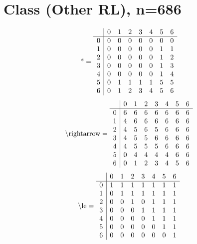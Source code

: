 \documentclass[11pt]{article}
\begin{document}
\section{Class (Other RL), n=686}
\[\text{*} = 
\begin{array}{r | r r r r r r r}
 & 0 & 1 & 2 & 3 & 4 & 5 & 6 \\ \hline
0 & 0 & 0 & 0 & 0 & 0 & 0 & 0 \\
1 & 0 & 0 & 0 & 0 & 0 & 1 & 1 \\
2 & 0 & 0 & 0 & 0 & 0 & 1 & 2 \\
3 & 0 & 0 & 0 & 0 & 0 & 1 & 3 \\
4 & 0 & 0 & 0 & 0 & 0 & 1 & 4 \\
5 & 0 & 1 & 1 & 1 & 1 & 5 & 5 \\
6 & 0 & 1 & 2 & 3 & 4 & 5 & 6 \\
\end{array}
\]
\[\text{\textbackslash rightarrow} = 
\begin{array}{r | r r r r r r r}
 & 0 & 1 & 2 & 3 & 4 & 5 & 6 \\ \hline
0 & 6 & 6 & 6 & 6 & 6 & 6 & 6 \\
1 & 4 & 6 & 6 & 6 & 6 & 6 & 6 \\
2 & 4 & 5 & 6 & 5 & 6 & 6 & 6 \\
3 & 4 & 5 & 5 & 6 & 6 & 6 & 6 \\
4 & 4 & 5 & 5 & 5 & 6 & 6 & 6 \\
5 & 0 & 4 & 4 & 4 & 4 & 6 & 6 \\
6 & 0 & 1 & 2 & 3 & 4 & 5 & 6 \\
\end{array}
\]
\[\text{\textbackslash le} = 
\begin{array}{r | r r r r r r r}
 & 0 & 1 & 2 & 3 & 4 & 5 & 6 \\ \hline
0 & 1 & 1 & 1 & 1 & 1 & 1 & 1 \\
1 & 0 & 1 & 1 & 1 & 1 & 1 & 1 \\
2 & 0 & 0 & 1 & 0 & 1 & 1 & 1 \\
3 & 0 & 0 & 0 & 1 & 1 & 1 & 1 \\
4 & 0 & 0 & 0 & 0 & 1 & 1 & 1 \\
5 & 0 & 0 & 0 & 0 & 0 & 1 & 1 \\
6 & 0 & 0 & 0 & 0 & 0 & 0 & 1 \\
\end{array}
\]
\end{document}
